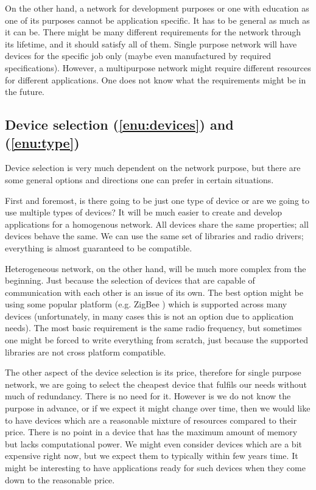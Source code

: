 \documentclass[
  print, %
  Table,   %
  nolof,     %
  nolot,     %
           oneside
]{fithesis3}
\begin{document}
  On the other hand, a network for development purposes or one with education as one of its purposes cannot be application specific. It has to be general as much as it can be. There might be many different requirements for the network through its lifetime, and it should satisfy all of them. Single purpose network will have devices for the specific job only (maybe even manufactured by required specifications). However, a multipurpose network might require different resources for different applications. One does not know what the requirements might be in the future.

  \subsection{Device selection (\ref{enu:devices}) and (\ref{enu:type})}
  Device selection is very much dependent on the network purpose, but there are some general options and directions one can prefer in certain situations.

  First and foremost, is there going to be just one type of device or are we going to use multiple types of devices? It will be much easier to create and develop applications for a homogenous network.  All devices share the same properties; all devices behave the same. We can use the same set of libraries and radio drivers; everything is almost guaranteed to be compatible.

  Heterogeneous network, on the other hand, will be much more complex from the beginning. Just because the selection of devices that are capable of communication with each other is an issue of its own. The best option might be using some popular platform (e.g. ZigBee \cite{alliance2006zigbee}) which is supported across many devices (unfortunately, in many cases this is not an option due to application needs). The most basic requirement is the same radio frequency, but sometimes one might be forced to write everything from scratch, just because the supported libraries are not cross platform compatible.

  The other aspect of the device selection is its price, therefore for single purpose network, we are going to select the cheapest device that fulfils our needs without much of redundancy. There is no need for it. However is we do not know the purpose in advance, or if we expect it might change over time, then we would like to have devices which are a reasonable mixture of resources compared to their price. There is no point in a device that has the maximum amount of memory but lacks computational power. We might even consider devices which are a bit expensive right now, but we expect them to typically within few years time. It might be interesting to have applications ready for such devices when they come down to the reasonable price.
\end{document}
